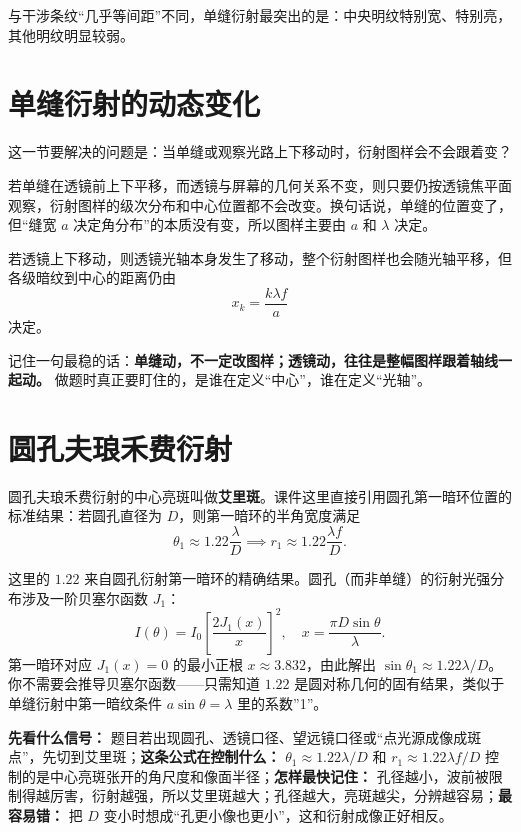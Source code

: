 \documentclass[lang=cn,11pt]{elegantbook}
\newcommand{\bridge}[1]{\begin{note}#1\end{note}}
\begin{document}
\begin{remark}
与干涉条纹“几乎等间距”不同，单缝衍射最突出的是：中央明纹特别宽、特别亮，其他明纹明显较弱。
\end{remark}

\section{单缝衍射的动态变化}

这一节要解决的问题是：当单缝或观察光路上下移动时，衍射图样会不会跟着变？

若单缝在透镜前上下平移，而透镜与屏幕的几何关系不变，则只要仍按透镜焦平面观察，衍射图样的级次分布和中心位置都不会改变。换句话说，单缝的位置变了，但“缝宽 \(a\) 决定角分布”的本质没有变，所以图样主要由 \(a\) 和 \(\lambda\) 决定。

若透镜上下移动，则透镜光轴本身发生了移动，整个衍射图样也会随光轴平移，但各级暗纹到中心的距离仍由
\[
x_k=\frac{k\lambda f}{a}
\]
决定。

\begin{note}
记住一句最稳的话：\textbf{单缝动，不一定改图样；透镜动，往往是整幅图样跟着轴线一起动。} 做题时真正要盯住的，是谁在定义“中心”，谁在定义“光轴”。
\end{note}

\section{圆孔夫琅禾费衍射}

圆孔夫琅禾费衍射的中心亮斑叫做\textbf{艾里斑}。课件这里直接引用圆孔第一暗环位置的标准结果：若圆孔直径为 \(D\)，则第一暗环的半角宽度满足
\[
\theta_1\approx 1.22\frac{\lambda}{D}
\implies
r_1\approx 1.22\frac{\lambda f}{D}.
\]

\bridge{这里的 \(1.22\) 来自圆孔衍射第一暗环的精确结果。圆孔（而非单缝）的衍射光强分布涉及一阶贝塞尔函数 \(J_1\)：
\[
I(\theta)=I_0\left[\frac{2J_1(x)}{x}\right]^2,\quad x=\frac{\pi D\sin\theta}{\lambda}.
\]
第一暗环对应 \(J_1(x)=0\) 的最小正根 \(x\approx 3.832\)，由此解出 \(\sin\theta_1\approx 1.22\lambda/D\)。你不需要会推导贝塞尔函数——只需知道 \(1.22\) 是圆对称几何的固有结果，类似于单缝衍射中第一暗纹条件 \(a\sin\theta=\lambda\) 里的系数”1”。}

\begin{note}
\textbf{先看什么信号：} 题目若出现圆孔、透镜口径、望远镜口径或“点光源成像成斑点”，先切到艾里斑；\textbf{这条公式在控制什么：} \(\theta_1\approx 1.22\lambda/D\) 和 \(r_1\approx 1.22\lambda f/D\) 控制的是中心亮斑张开的角尺度和像面半径；\textbf{怎样最快记住：} 孔径越小，波前被限制得越厉害，衍射越强，所以艾里斑越大；孔径越大，亮斑越尖，分辨越容易；\textbf{最容易错：} 把 \(D\) 变小时想成“孔更小像也更小”，这和衍射成像正好相反。
\end{note}
\end{document}
